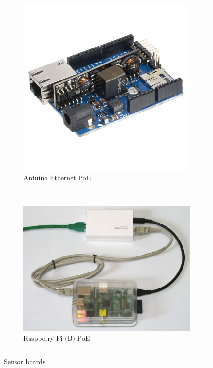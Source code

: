 \documentclass[12pt, a4paper,twoside]{tesi_upf}
\begin{document}
    \begin{figure}
        \centering
        \begin{subfigure}[b]{0.3\textwidth}
                \includegraphics[width=\textwidth]{./Figures/arduinoethernetpoe.jpg}
                \caption{Arduino Ethernet PoE}
                \label{fig:arduinoethernetpoe}
        \end{subfigure}%
        ~ %
        \begin{subfigure}[b]{0.3\textwidth}
                \includegraphics[width=\textwidth]{./Figures/poe-rpi.jpg}
                \caption{Raspberry Pi (B) PoE}
                \label{fig:poerpi}
        \end{subfigure}
        \rule{18em}{0.5pt}
        \caption{Sensor boards}\label{fig:sensorboards}
		\end{figure}
\end{document}
